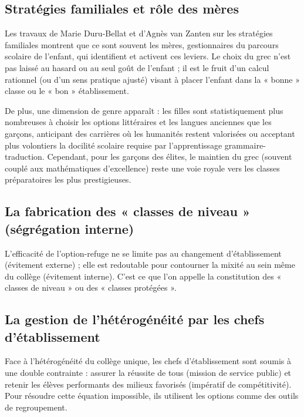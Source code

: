 \subsection{Stratégies familiales et rôle des mères}

Les travaux de Marie Duru-Bellat et d'Agnès van Zanten sur les stratégies familiales montrent que ce
sont souvent les mères, gestionnaires du parcours scolaire de l'enfant, qui identifient et activent
ces leviers.\cite{I-3-1-ref33} Le choix du grec n'est pas laissé au hasard ou au seul goût de
l'enfant ; il est le fruit d'un calcul rationnel (ou d'un sens pratique ajusté) visant à placer
l'enfant dans la « bonne » classe ou le « bon » établissement.

De plus, une dimension de genre apparaît : les filles sont statistiquement plus nombreuses à choisir
les options littéraires et les langues anciennes que les garçons, anticipant des carrières où les
humanités restent valorisées ou acceptant plus volontiers la docilité scolaire requise par
l'apprentissage \og grammaire-traduction\fg{}.\cite{I-3-1-ref34} Cependant, pour les garçons des
élites, le maintien du grec (souvent couplé aux mathématiques d'excellence) reste une voie royale
vers les classes préparatoires les plus prestigieuses.



\subsection{La fabrication des « classes de niveau » (ségrégation interne)}

L'efficacité de l'option-refuge ne se limite pas au changement d'établissement (évitement externe) ;
elle est redoutable pour contourner la mixité au sein même du collège (évitement interne). C'est ce
que l'on appelle la constitution des « classes de niveau » ou des « classes protégées ».



\subsection{La gestion de l'hétérogénéité par les chefs d'établissement}

Face à l'hétérogénéité du collège unique, les chefs d'établissement sont soumis à une double
contrainte : assurer la réussite de tous (mission de service public) et retenir les élèves
performants des milieux favorisés (impératif de compétitivité). Pour résoudre cette équation
impossible, ils utilisent les options comme des outils de regroupement.\cite{I-3-1-ref4}

